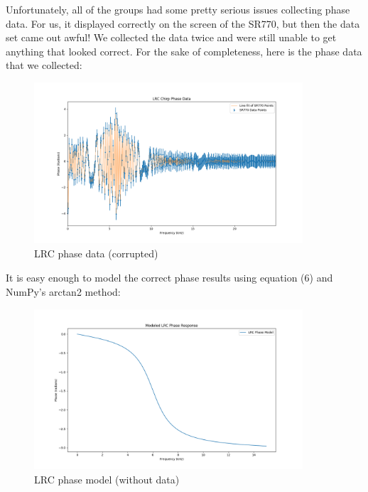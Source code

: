 \documentclass{article}
\begin{document}
Unfortunately, all of the groups had some pretty serious issues collecting
phase data. For us, it displayed correctly on the screen of the SR770, but then
the data set came out awful! We collected the data twice and were still unable
to get anything that looked correct. For the sake of completeness, here is the
phase data that we collected:

\begin{figure}[H]
    \centering
\begin{minipage}{11cm}
\begin{tcolorbox}
    \centering
        \includegraphics[width=10cm, height=6cm]{figures/figure25.png}
        \caption{LRC phase data (corrupted)}
        \label{fig:fig25}
\end{tcolorbox}
\end{minipage}
\end{figure}

It is easy enough to model the correct phase results using equation (6) and
NumPy's arctan2 method:

\begin{figure}[H]
    \centering
\begin{minipage}{11cm}
\begin{tcolorbox}
    \centering
        \includegraphics[width=10cm, height=6cm]{figures/figure26.png}
        \caption{LRC phase model (without data)}
        \label{fig:fig26}
\end{tcolorbox}
\end{minipage}
\end{figure}
\end{document}
